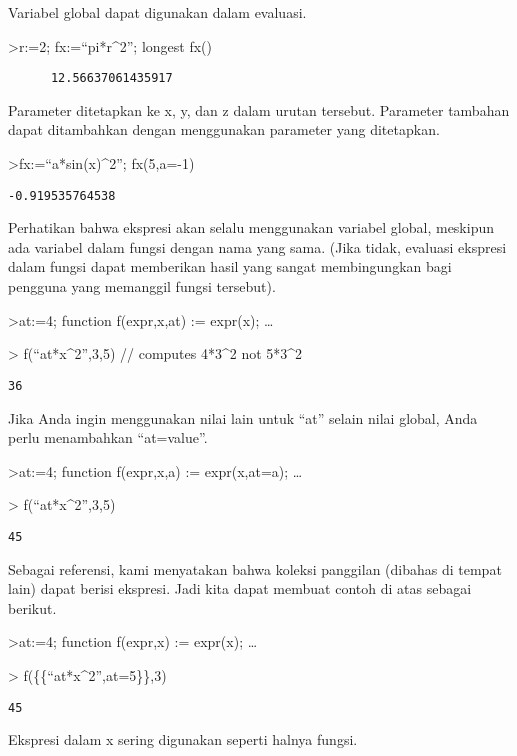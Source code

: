 \documentclass[
]{book}
\begin{document}
Variabel global dapat digunakan dalam evaluasi.

\textgreater r:=2; fx:=``pi*r\^{}2''; longest fx()

\begin{verbatim}
      12.56637061435917 
\end{verbatim}

Parameter ditetapkan ke x, y, dan z dalam urutan tersebut. Parameter tambahan dapat ditambahkan dengan menggunakan parameter yang ditetapkan.

\textgreater fx:=``a*sin(x)\^{}2''; fx(5,a=-1)

\begin{verbatim}
-0.919535764538
\end{verbatim}

Perhatikan bahwa ekspresi akan selalu menggunakan variabel global, meskipun ada variabel dalam fungsi dengan nama yang sama. (Jika tidak, evaluasi ekspresi dalam fungsi dapat memberikan hasil yang sangat membingungkan bagi pengguna yang memanggil fungsi tersebut).

\textgreater at:=4; function f(expr,x,at) := expr(x); \ldots{}

\textgreater{} f(``at*x\^{}2'',3,5) // computes 4*3\^{}2 not 5*3\^{}2

\begin{verbatim}
36
\end{verbatim}

Jika Anda ingin menggunakan nilai lain untuk ``at'' selain nilai global, Anda perlu menambahkan ``at=value''.

\textgreater at:=4; function f(expr,x,a) := expr(x,at=a); \ldots{}

\textgreater{} f(``at*x\^{}2'',3,5)

\begin{verbatim}
45
\end{verbatim}

Sebagai referensi, kami menyatakan bahwa koleksi panggilan (dibahas di tempat lain) dapat berisi ekspresi. Jadi kita dapat membuat contoh di atas sebagai berikut.

\textgreater at:=4; function f(expr,x) := expr(x); \ldots{}

\textgreater{} f(\{\{``at*x\^{}2'',at=5\}\},3)

\begin{verbatim}
45
\end{verbatim}

Ekspresi dalam x sering digunakan seperti halnya fungsi.
\end{document}
